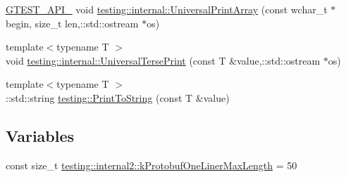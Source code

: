 \begin{DoxyCompactItemize}
\item 
\hyperlink{gtest-port_8h_aa73be6f0ba4a7456180a94904ce17790}{G\+T\+E\+S\+T\+\_\+\+A\+P\+I\+\_\+} void \hyperlink{namespacetesting_1_1internal_ae95ea0aea80977c0870df98b27a17cac}{testing\+::internal\+::\+Universal\+Print\+Array} (const wchar\+\_\+t $\ast$begin, size\+\_\+t len,\+::std\+::ostream $\ast$os)
\item 
{\footnotesize template$<$typename T $>$ }\\void \hyperlink{namespacetesting_1_1internal_ab3d834fb6c31d29e36400cc19905294b}{testing\+::internal\+::\+Universal\+Terse\+Print} (const T \&value,\+::std\+::ostream $\ast$os)
\item 
{\footnotesize template$<$typename T $>$ }\\\+::std\+::string \hyperlink{namespacetesting_aa5717bb1144edd1d262d310ba70c82ed}{testing\+::\+Print\+To\+String} (const T \&value)
\end{DoxyCompactItemize}
\subsection*{Variables}
\begin{DoxyCompactItemize}
\item 
const size\+\_\+t \hyperlink{namespacetesting_1_1internal2_a140c8efd51e63a3def98445bff107518}{testing\+::internal2\+::k\+Protobuf\+One\+Liner\+Max\+Length} = 50
\end{DoxyCompactItemize}
